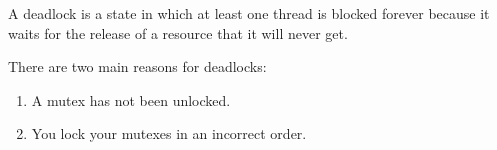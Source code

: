 A deadlock is a state in which at least one thread is blocked forever because it waits for the release of a resource that it will never get.

There are two main reasons for deadlocks:

\begin{enumerate}
\item 
A mutex has not been unlocked.

\item 
You lock your mutexes in an incorrect order.
\end{enumerate}